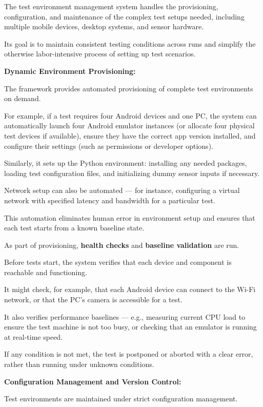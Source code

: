 {{The test environment management system handles the provisioning, configuration,
and maintenance of the complex test setups needed, including multiple mobile
devices, desktop systems, and sensor hardware.

Its goal is to maintain consistent testing conditions across runs and simplify
the otherwise labor-intensive process of setting up test scenarios.

\textbf{Dynamic Environment Provisioning:}

The framework provides automated provisioning of complete test environments on
demand.

For example, if a test requires four Android devices and one PC, the system can
automatically launch four Android emulator instances (or allocate four physical
test devices if available), ensure they have the correct app version installed,
and configure their settings (such as permissions or developer options).

Similarly, it sets up the Python environment: installing any needed packages,
loading test configuration files, and initializing dummy sensor inputs if
necessary.

Network setup can also be automated --- for instance, configuring a virtual
network with specified latency and bandwidth for a particular test.

This automation eliminates human error in environment setup and ensures that
each test starts from a known baseline state.

As part of provisioning, \textbf{health checks}
 and \textbf{baseline validation}
 are run.

Before tests start, the system verifies that each device and component is
reachable and functioning.

It might check, for example, that each Android device can connect to the Wi-Fi
network, or that the PC's camera is accessible for a test.

It also verifies performance baselines --- e.g., measuring current CPU load to
ensure the test machine is not too busy, or checking that an emulator is running
at real-time speed.

If any condition is not met, the test is postponed or aborted with a clear
error, rather than running under unknown conditions.

\textbf{Configuration Management and Version Control:}

Test environments are maintained under strict configuration management.

}}
